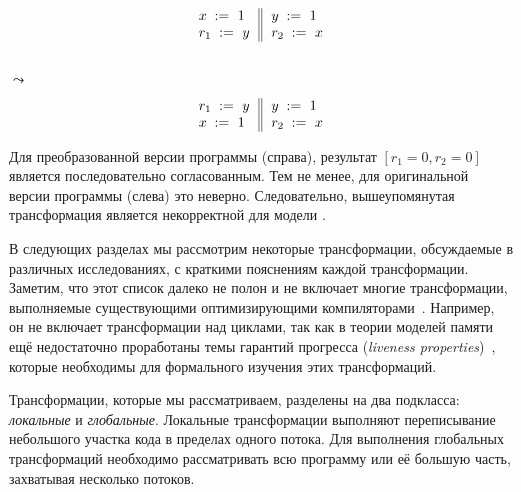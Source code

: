 \begin{minipage}{0.45\linewidth}
\begin{equation*}
\inarrII{
   \writeInst{}{x}{1}   \\
   \readInst{}{r_1}{y}  \\
}{
  \writeInst{}{y}{1}   \\
  \readInst{}{r_2}{x}  \\
}
\end{equation*}
\end{minipage}\hfill%
\begin{minipage}{0.05\linewidth}
\Large~\\ $\leadsto$
\end{minipage}\hfill%
\begin{minipage}{0.45\linewidth}
\begin{equation*}
\inarrII{
   \readInst{}{r_1}{y}  \\
   \writeInst{}{x}{1}   \\
}{
  \writeInst{}{y}{1}   \\
  \readInst{}{r_2}{x}  \\
}
\end{equation*}
\end{minipage}

Для преобразованной версии программы (справа),
результат $[r_1=0, r_2=0]$ является последовательно согласованным. 
Тем не менее, для оригинальной версии программы (слева) это неверно. 
Следовательно, вышеупомянутая трансформация 
является некорректной для модели \SC. 

В следующих разделах мы рассмотрим  некоторые  трансформации,
обсуждаемые в различных исследованиях, 
с краткими пояснениям каждой трансформации. 
Заметим, что этот список далеко не полон 
и не включает многие трансформации, 
выполняемые существующими оптимизирующими компиляторами~\cite{Muchnick:ACDI97}.
Например, он не включает трансформации над циклами,
так как в теории моделей памяти ещё недостаточно 
проработаны темы гарантий прогресса 
(\emph{liveness properties})~\cite{Lahav-al:arXiv20}, 
которые необходимы для формального 
изучения этих трансформаций. 

Трансформации, которые мы рассматриваем,  
разделены на два подкласса: \emph{локальные} и \emph{глобальные}.
Локальные трансформации выполняют переписывание 
небольшого участка кода в пределах одного потока. 
Для выполнения глобальных трансформаций 
необходимо рассматривать всю программу 
или её большую часть, 
захватывая несколько потоков.      
 
